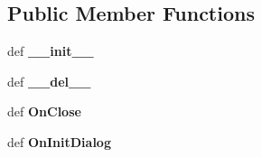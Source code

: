 \subsection*{Public Member Functions}
\begin{DoxyCompactItemize}
\item 
\hypertarget{classtop_frame_1_1_dlg_options_a6893e868e13cea7691a5ce907aa26698}{def {\bfseries \-\_\-\-\_\-init\-\_\-\-\_\-}}\label{classtop_frame_1_1_dlg_options_a6893e868e13cea7691a5ce907aa26698}

\item 
\hypertarget{classtop_frame_1_1_dlg_options_ab6c6573237008353197b5d59edf483aa}{def {\bfseries \-\_\-\-\_\-del\-\_\-\-\_\-}}\label{classtop_frame_1_1_dlg_options_ab6c6573237008353197b5d59edf483aa}

\item 
\hypertarget{classtop_frame_1_1_dlg_options_a345d1bbcdca3053fcbb64d5c0107048d}{def {\bfseries On\-Close}}\label{classtop_frame_1_1_dlg_options_a345d1bbcdca3053fcbb64d5c0107048d}

\item 
\hypertarget{classtop_frame_1_1_dlg_options_a3ee30fad536ba149910ac425bff06b90}{def {\bfseries On\-Init\-Dialog}}\label{classtop_frame_1_1_dlg_options_a3ee30fad536ba149910ac425bff06b90}

\end{DoxyCompactItemize}
